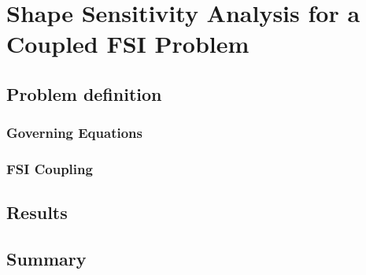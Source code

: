 \chapter{Shape Sensitivity Analysis for a Coupled FSI Problem}

\section{Problem definition}
\subsection{Governing Equations}
\subsection{FSI Coupling}
\section{Results}
\section{Summary}
